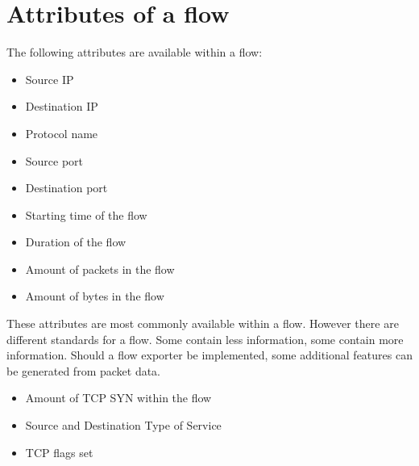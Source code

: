\section{Attributes of a flow}
\label{flowattributes}
The following attributes are available within a flow:
\begin{itemize}
\item Source IP
\item Destination IP
\item Protocol name
\item Source port
\item Destination port
\item Starting time of the flow
\item Duration of the flow
\item Amount of packets in the flow
\item Amount of bytes in the flow
\end{itemize}
These attributes are most commonly available within a flow. However there are different standards for a flow. Some contain less information, some contain more information. Should a flow exporter be implemented, some additional features can be generated from packet data. 
\begin{itemize}
\item Amount of TCP SYN within the flow
\item Source and Destination Type of Service
\item TCP flags set
\end{itemize}

